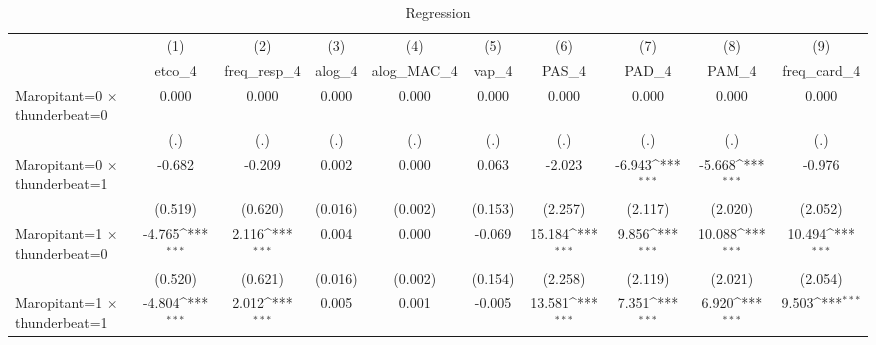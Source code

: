 \begin{table}[htbp]\centering
\def\sym#1{\ifmmode^{#1}\else\(^{#1}\)\fi}
\caption{Regression}
\begin{tabular}{l*{9}{c}}
\toprule
                    &\multicolumn{1}{c}{(1)}&\multicolumn{1}{c}{(2)}&\multicolumn{1}{c}{(3)}&\multicolumn{1}{c}{(4)}&\multicolumn{1}{c}{(5)}&\multicolumn{1}{c}{(6)}&\multicolumn{1}{c}{(7)}&\multicolumn{1}{c}{(8)}&\multicolumn{1}{c}{(9)}\\
                    &\multicolumn{1}{c}{etco\_4}&\multicolumn{1}{c}{freq\_resp\_4}&\multicolumn{1}{c}{alog\_4}&\multicolumn{1}{c}{alog\_MAC\_4}&\multicolumn{1}{c}{vap\_4}&\multicolumn{1}{c}{PAS\_4}&\multicolumn{1}{c}{PAD\_4}&\multicolumn{1}{c}{PAM\_4}&\multicolumn{1}{c}{freq\_card\_4}\\
\midrule
Maropitant=0 $\times$ thunderbeat=0&       0.000         &       0.000         &       0.000         &       0.000         &       0.000         &       0.000         &       0.000         &       0.000         &       0.000         \\
                    &         (.)         &         (.)         &         (.)         &         (.)         &         (.)         &         (.)         &         (.)         &         (.)         &         (.)         \\
\addlinespace
Maropitant=0 $\times$ thunderbeat=1&      -0.682         &      -0.209         &       0.002         &       0.000         &       0.063         &      -2.023         &      -6.943\sym{***}&      -5.668\sym{***}&      -0.976         \\
                    &     (0.519)         &     (0.620)         &     (0.016)         &     (0.002)         &     (0.153)         &     (2.257)         &     (2.117)         &     (2.020)         &     (2.052)         \\
\addlinespace
Maropitant=1 $\times$ thunderbeat=0&      -4.765\sym{***}&       2.116\sym{***}&       0.004         &       0.000         &      -0.069         &      15.184\sym{***}&       9.856\sym{***}&      10.088\sym{***}&      10.494\sym{***}\\
                    &     (0.520)         &     (0.621)         &     (0.016)         &     (0.002)         &     (0.154)         &     (2.258)         &     (2.119)         &     (2.021)         &     (2.054)         \\
\addlinespace
Maropitant=1 $\times$ thunderbeat=1&      -4.804\sym{***}&       2.012\sym{***}&       0.005         &       0.001         &      -0.005         &      13.581\sym{***}&       7.351\sym{***}&       6.920\sym{***}&       9.503\sym{***}\\

\end{tabular}
\end{table}
